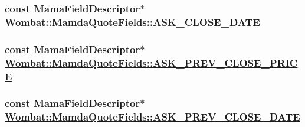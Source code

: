 \hypertarget{classWombat_1_1MamdaQuoteFields_6db589d14293d3c51eaf29bd33d9003b}{
\subsubsection[ASK\_\-CLOSE\_\-DATE]{\setlength{\rightskip}{0pt plus 5cm}const Mama\-Field\-Descriptor$\ast$ \hyperlink{classWombat_1_1MamdaQuoteFields_6db589d14293d3c51eaf29bd33d9003b}{Wombat::Mamda\-Quote\-Fields::ASK\_\-CLOSE\_\-DATE}}}
\label{classWombat_1_1MamdaQuoteFields_6db589d14293d3c51eaf29bd33d9003b}


\hypertarget{classWombat_1_1MamdaQuoteFields_45e4292ad349bf82196b4a07ed6d04c7}{
\subsubsection[ASK\_\-PREV\_\-CLOSE\_\-PRICE]{\setlength{\rightskip}{0pt plus 5cm}const Mama\-Field\-Descriptor$\ast$ \hyperlink{classWombat_1_1MamdaQuoteFields_45e4292ad349bf82196b4a07ed6d04c7}{Wombat::Mamda\-Quote\-Fields::ASK\_\-PREV\_\-CLOSE\_\-PRICE}}}
\label{classWombat_1_1MamdaQuoteFields_45e4292ad349bf82196b4a07ed6d04c7}


\hypertarget{classWombat_1_1MamdaQuoteFields_2a0a10e1c834fd5aedca9393b98590a6}{
\subsubsection[ASK\_\-PREV\_\-CLOSE\_\-DATE]{\setlength{\rightskip}{0pt plus 5cm}const Mama\-Field\-Descriptor$\ast$ \hyperlink{classWombat_1_1MamdaQuoteFields_2a0a10e1c834fd5aedca9393b98590a6}{Wombat::Mamda\-Quote\-Fields::ASK\_\-PREV\_\-CLOSE\_\-DATE}}}
\label{classWombat_1_1MamdaQuoteFields_2a0a10e1c834fd5aedca9393b98590a6}


